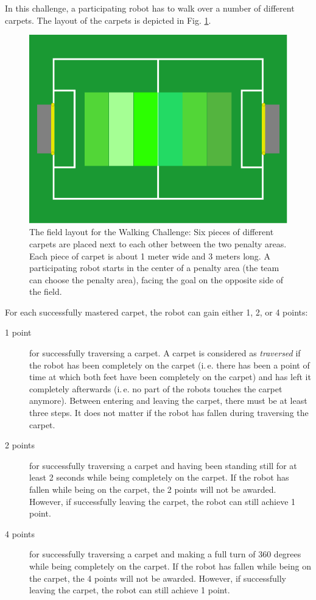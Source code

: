 \documentclass[12pt]{article}
\newcommand{\ie}{\mbox{i.\,e.}\xspace}
\begin{document}
In this challenge, a participating robot has to walk over a number of different carpets. The layout of the carpets is depicted in Fig. \ref{fig:walking_challenge}.

\begin{figure}[th!]
\centerline{\includegraphics[width=0.6\columnwidth]{figures/walking-challenge}}
\caption{The field layout for the Walking Challenge: Six pieces of different carpets are placed next to each other between the two penalty areas. Each piece of carpet is about 1 meter wide and 3 meters long. A participating robot starts in the center of a penalty area (the team can choose the penalty area), facing the goal on the opposite side of the field.}
\label{fig:walking_challenge}
\end{figure}

For each successfully mastered carpet, the robot can gain either 1, 2, or 4 points: 

\begin{description}
\item[1 point] for successfully traversing a carpet. A carpet is considered as \textit{traversed} if the robot has been completely on the carpet (\ie there has been a point of time at which both feet have been completely on the carpet) and has left it completely afterwards (\ie no part of the robots touches the carpet anymore). Between entering and leaving the carpet, there must be at least three steps. It does not matter if the robot has fallen during traversing the carpet.
\item[2 points] for successfully traversing a carpet and having been standing still for at least 2 seconds while being completely on the carpet. If the robot has fallen while being on the carpet, the 2 points will not be awarded. However, if successfully leaving the carpet, the robot can still achieve 1 point.
\item[4 points] for successfully traversing a carpet and making a full turn of 360 degrees while being completely on the carpet. If the robot has fallen while being on the carpet, the 4 points will not be awarded. However, if successfully leaving the carpet, the robot can still achieve 1 point.
\end{description}
\end{document}
